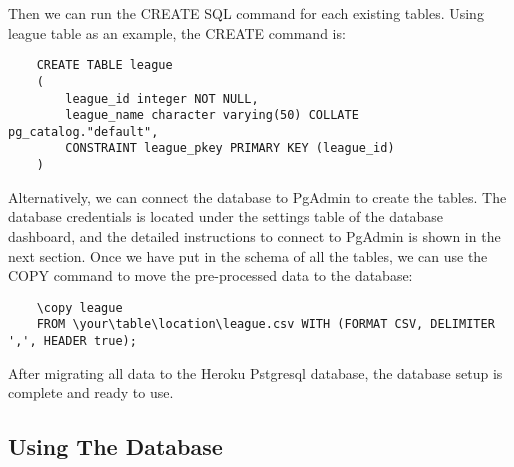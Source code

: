 Then we can run the CREATE SQL command for each existing tables. Using league table as an example, the CREATE command is:
\begin{verbatim}
    CREATE TABLE league
    (
        league_id integer NOT NULL,
        league_name character varying(50) COLLATE pg_catalog."default",
        CONSTRAINT league_pkey PRIMARY KEY (league_id)
    )
\end{verbatim}
Alternatively, we can connect the database to PgAdmin to create the tables. The database credentials is located under the settings table of the database dashboard, and the detailed instructions to connect to PgAdmin is shown in the next section. 
Once we have put in the schema of all the tables, we can use the COPY command to move the pre-processed data to the database:
\begin{verbatim}
    \copy league 
    FROM \your\table\location\league.csv WITH (FORMAT CSV, DELIMITER ',', HEADER true);
\end{verbatim}
After migrating all data to the Heroku Pstgresql database, the database setup is complete and ready to use.
\subsection{Using The Database}
